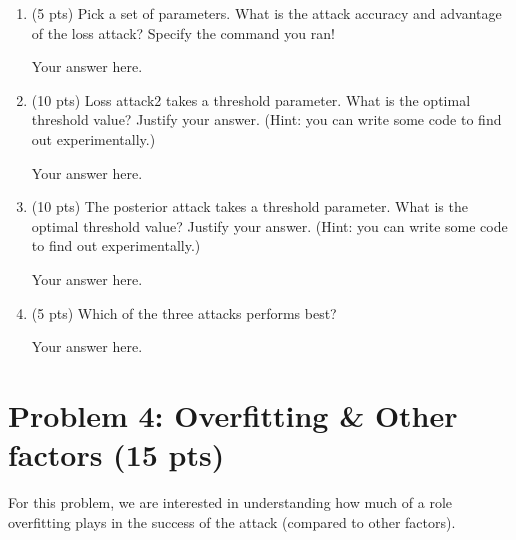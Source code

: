 %
\begin{enumerate}
%
	\item (5 pts) Pick a set of parameters. What is the attack accuracy and advantage of the loss attack? Specify the command you ran!
	
	\begin{answer}
	
		Your answer here.
		
	\end{answer}
	
	\item (10 pts) Loss attack2 takes a threshold parameter. What is the optimal threshold value? Justify your answer. (Hint: you can write some code to find out experimentally.)
	
	\begin{answer}
	
		Your answer here.
		
	\end{answer}

	\item (10 pts) The posterior attack takes a threshold parameter. What is the optimal threshold value? Justify your answer. (Hint: you can write some code to find out experimentally.)
	
	\begin{answer}
	
		Your answer here.
		
	\end{answer}
	
	
	\item (5 pts) Which of the three attacks performs best?
	
	\begin{answer}
	
		Your answer here.
		
	\end{answer}
%
\end{enumerate}


\newpage
\section*{Problem 4: Overfitting \& Other factors (15 pts)}
%
For this problem, we are interested in understanding how much of a role overfitting plays in the success of the attack (compared to other factors).

